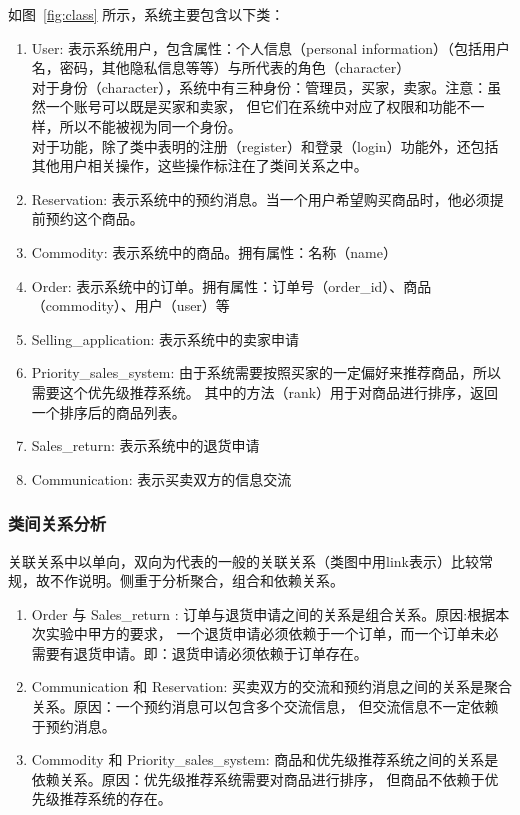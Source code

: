 \documentclass[12pt, a4paper]{ctexart}
\begin{document}
如图~\ref{fig:class} 所示，系统主要包含以下类：
\begin{enumerate}
    \item User: 
        表示系统用户，包含属性：个人信息（personal information）（包括用户名，密码，其他隐私信息等等）与所代表的角色（character）\\
        对于身份（character），系统中有三种身份：管理员，买家，卖家。注意：虽然一个账号可以既是买家和卖家，
        但它们在系统中对应了权限和功能不一样，所以不能被视为同一个身份。\\
        对于功能，除了类中表明的注册（register）和登录（login）功能外，还包括其他用户相关操作，这些操作标注在了类间关系之中。\\
    \item Reservation:
        表示系统中的预约消息。当一个用户希望购买商品时，他必须提前预约这个商品。
    \item Commodity:
        表示系统中的商品。拥有属性：名称（name）\\
    \item Order:
        表示系统中的订单。拥有属性：订单号（order\_id）、商品（commodity）、用户（user）等\\
    \item Selling\_application:
        表示系统中的卖家申请\\
    \item Priority\_sales\_system:
        由于系统需要按照买家的一定偏好来推荐商品，所以需要这个优先级推荐系统。
        其中的方法（rank）用于对商品进行排序，返回一个排序后的商品列表。\\
    \item Sales\_return:
        表示系统中的退货申请\\
    \item Communication:
        表示买卖双方的信息交流\\
\end{enumerate}

\subsubsection{类间关系分析}
关联关系中以单向，双向为代表的一般的关联关系（类图中用link表示）比较常规，故不作说明。侧重于分析聚合，组合和依赖关系。\\
\begin{enumerate}
    \item Order 与 Sales\_return : 
        订单与退货申请之间的关系是组合关系。原因:根据本次实验中甲方的要求，
        一个退货申请必须依赖于一个订单，而一个订单未必需要有退货申请。即：退货申请必须依赖于订单存在。\\
    \item Communication 和 Reservation:
        买卖双方的交流和预约消息之间的关系是聚合关系。原因：一个预约消息可以包含多个交流信息，
        但交流信息不一定依赖于预约消息。\\
    \item Commodity 和 Priority\_sales\_system:
        商品和优先级推荐系统之间的关系是依赖关系。原因：优先级推荐系统需要对商品进行排序，
        但商品不依赖于优先级推荐系统的存在。\\
\end{enumerate}
\end{document}
